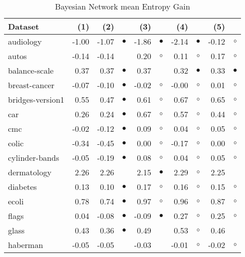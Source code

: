 \begin{table}[thb]
\caption{\label{bnmeg}Bayesian Network mean Entropy Gain}
\footnotesize
{\centering \begin{tabular}{lrr@{\hspace{0.1cm}}cr@{\hspace{0.1cm}}cr@{\hspace{0.1cm}}cr@{\hspace{0.1cm}}c}
\\
\hline
Dataset & (1)& (2) & & (3) & & (4) & & (5) & \\
\hline
audiology & -1.00 & -1.07 & $\bullet$ & -1.86 & $\bullet$ & -2.14 & $\bullet$ & -0.12 &   $\circ$\\
autos & -0.14 & -0.14 &           &  0.20 &   $\circ$ &  0.11 &   $\circ$ &  0.17 &   $\circ$\\
balance-scale &  0.37 &  0.37 & $\bullet$ &  0.37 &           &  0.32 & $\bullet$ &  0.33 & $\bullet$\\
breast-cancer & -0.07 & -0.10 & $\bullet$ & -0.02 &   $\circ$ & -0.00 &   $\circ$ &  0.01 &   $\circ$\\
bridges-version1 &  0.55 &  0.47 & $\bullet$ &  0.61 &   $\circ$ &  0.67 &   $\circ$ &  0.65 &   $\circ$\\
car &  0.26 &  0.24 & $\bullet$ &  0.67 &   $\circ$ &  0.57 &   $\circ$ &  0.44 &   $\circ$\\
cmc & -0.02 & -0.12 & $\bullet$ &  0.09 &   $\circ$ &  0.04 &   $\circ$ &  0.05 &   $\circ$\\
colic & -0.34 & -0.45 & $\bullet$ &  0.00 &   $\circ$ & -0.17 &   $\circ$ &  0.00 &   $\circ$\\
cylinder-bands & -0.05 & -0.19 & $\bullet$ &  0.08 &   $\circ$ &  0.04 &   $\circ$ &  0.05 &   $\circ$\\
dermatology &  2.26 &  2.26 &           &  2.15 & $\bullet$ &  2.29 &   $\circ$ &  2.25 &          \\
diabetes &  0.13 &  0.10 & $\bullet$ &  0.17 &   $\circ$ &  0.16 &   $\circ$ &  0.15 &   $\circ$\\
ecoli &  0.78 &  0.74 & $\bullet$ &  0.97 &   $\circ$ &  0.96 &   $\circ$ &  0.87 &   $\circ$\\
flags &  0.04 & -0.08 & $\bullet$ & -0.09 & $\bullet$ &  0.27 &   $\circ$ &  0.25 &   $\circ$\\
glass &  0.43 &  0.36 & $\bullet$ &  0.49 &           &  0.53 &   $\circ$ &  0.46 &          \\
haberman & -0.05 & -0.05 &           & -0.03 &           & -0.01 &   $\circ$ & -0.02 &   $\circ$\\

\end{tabular}}
\end{table}
